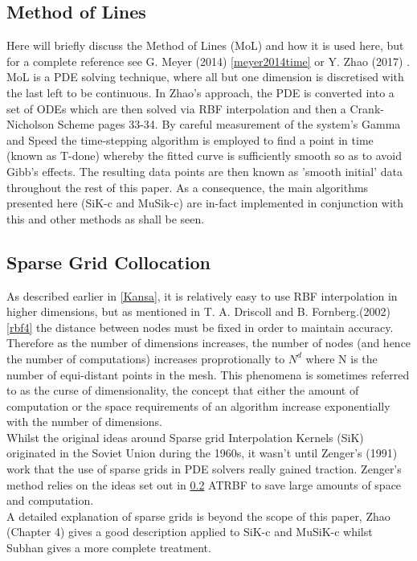 \documentclass[a4paper]{amsart}
\begin{document}
\subsection{Method of Lines}
Here will briefly discuss the Method of Lines (MoL) and how it is used here, but for a complete reference see G. Meyer (2014) \ref{meyer2014time} or Y. Zhao (2017) \cite{mski0}. MoL is a PDE solving technique, where all but one dimension is discretised with the last left to be continuous. In Zhao's approach, the PDE is converted into a set of ODEs which are then solved via RBF interpolation and then a Crank-Nicholson Scheme \cite{mski0} pages 33-34. By careful measurement of the system's Gamma and Speed the time-stepping algorithm is employed to find a point in time (known as T-done) whereby the fitted curve is sufficiently smooth so as to avoid Gibb's effects. The resulting data points are then known as 'smooth initial' data throughout the rest of this paper. As a consequence, the main algorithms presented here (SiK-c and MuSik-c) are in-fact implemented in conjunction with this and other methods as shall be seen.

\subsection{Sparse Grid Collocation}

As described earlier in \ref{Kansa}, it is relatively easy to use RBF interpolation in higher dimensions, but as mentioned in T. A. Driscoll and B. Fornberg.(2002) \ref{rbf4} the distance between nodes must be fixed in order to maintain accuracy. Therefore as the number of dimensions increases, the number of nodes (and hence the number of computations) increases proprotionally to $N^{d}$ where N is the number of equi-distant points in the mesh. This phenomena is sometimes referred to as the curse of dimensionality, the concept that either the amount of computation or the space requirements of an algorithm increase exponentially with the number of dimensions.\\

Whilst the original ideas around Sparse grid Interpolation Kernels (SiK) originated in the Soviet Union\cite{sik1}\cite{sik2} during the 1960s, it wasn't until Zenger's (1991) \cite{sik3} work that the use of sparse grids in PDE solvers really gained traction. Zenger's method relies on the ideas set out in \ref{} ATRBF to save large amounts of space and computation.\\

A detailed explanation of sparse grids is beyond the scope of this paper, Zhao \cite{mski0} (Chapter 4) gives a good description applied to SiK-c and MuSiK-c whilst Subhan \cite{mski} gives a more complete treatment.\\
\end{document}
